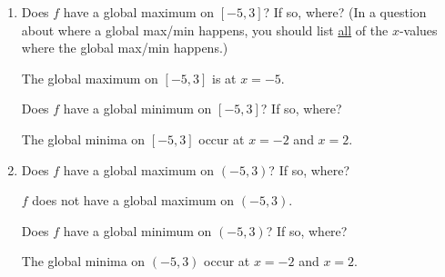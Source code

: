 \documentclass{article}
\begin{document}
\begin{enumerate}
\begin{enumerate}
\begin{enumerate}[resume]
      \begin{problem}[\vfill]
        Where are the local maxima?
      \end{problem}

      \begin{solution}
        There is a local maximum at $x=0$. 
      \end{solution}

    \item
      \begin{problem}[\vfill]
        Does $f$ have a global maximum on $[-5, 3]$? If so, where? (In a question about where a global max/min happens, you should list \uline{all} of the $x$-values where the global max/min happens.) 
      \end{problem}

      \begin{solution}
        The global maximum on $[-5, 3]$ is at $x=-5$.
      \end{solution}

      \begin{problem}[\vfill]
        Does $f$ have a global minimum on $[-5, 3]$? If so, where?
      \end{problem}

      \begin{solution}
        The global minima on $[-5, 3]$ occur at $x=-2$ and $x=2$. 
      \end{solution}

    \item
      \begin{problem}[\vfill]
        Does $f$ have a global maximum on $(-5, 3)$? If so, where? 
      \end{problem}

      \begin{solution}
        $f$ does not have a global maximum on $(-5, 3)$.
      \end{solution}

      \begin{problem}[\vfill\newpage]
        Does $f$ have a global minimum on $(-5, 3)$? If so, where? 
      \end{problem}

      \begin{solution}
          The global minima on $(-5, 3)$ occur at $x=-2$ and $x=2$. 
      \end{solution}

    \end{enumerate}


\end{enumerate}
\end{enumerate}
\end{document}
